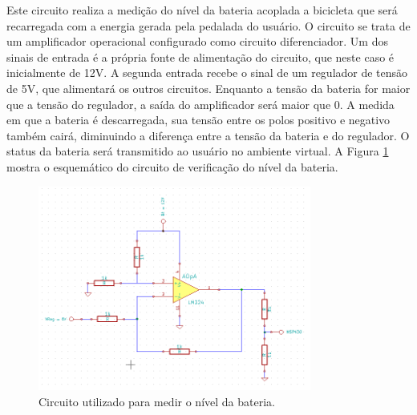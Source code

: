 Este circuito realiza a medição do nível da bateria acoplada a bicicleta que será recarregada com a energia gerada pela pedalada do usuário. O circuito se trata de um amplificador operacional configurado como circuito diferenciador. Um dos sinais de entrada é a própria fonte de alimentação do circuito, que neste caso é inicialmente de 12V. A segunda entrada recebe o sinal de um regulador de tensão de 5V, que alimentará os outros circuitos.
Enquanto a tensão da bateria for maior que a tensão do regulador, a saída do amplificador será maior que 0. A medida em que a bateria é descarregada, sua tensão entre os polos positivo e negativo também cairá, diminuindo a diferença entre a tensão da bateria e do regulador. O status da bateria será transmitido ao usuário no ambiente virtual. A Figura \ref{fig:circ_bat} mostra o esquemático do circuito de verificação do nível da bateria.

\begin{figure}[h]
  \centering
	\includegraphics[width=0.8\textwidth]{figuras/circuitoBateria.png}
  \caption{Circuito utilizado para medir o nível da bateria.}
  \label{fig:circ_bat}
\end{figure}



